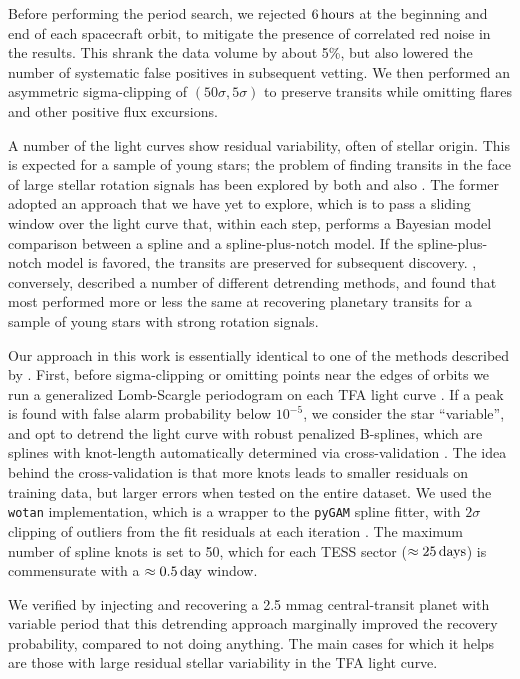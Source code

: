 \documentclass[12pt,twocolumn,tighten]{aastex62}
\begin{document}
Before performing the period search, we rejected $6\,{\rm hours}$ at
the beginning and end of each spacecraft orbit, to mitigate the
presence of correlated red noise in the results.  This shrank the data
volume by about 5\%, but also lowered the number of systematic false
positives in subsequent vetting.  We then performed an asymmetric
sigma-clipping of $(50\sigma,5\sigma)$ to preserve transits while
omitting flares and other positive flux excursions. 

A number of the light curves show residual variability, often of
stellar origin.  This is expected for a sample of young stars; the
problem of finding transits in the face of large stellar rotation
signals has been explored by both \citet{rizzuto_zeitV_2017} and also
\citet{hippke_wotan_2019}.  The former adopted an approach that we
have yet to explore, which is to pass a sliding window over the light
curve that, within each step, performs a Bayesian model comparison
between a spline and a spline-plus-notch model.  If the
spline-plus-notch model is favored, the transits are preserved for
subsequent discovery.  \citet{hippke_wotan_2019}, conversely,
described a number of different detrending methods, and found that
most performed more or less the same at recovering planetary transits
for a sample of young stars with strong rotation signals.

Our approach in this work is essentially identical to one of the
methods described by \citet{hippke_wotan_2019}.  First, before
sigma-clipping or omitting points near the edges of orbits we run a
generalized Lomb-Scargle periodogram on each TFA light curve
\citep{lomb_1976,scargle_studies_1982,vanderplas_periodograms_2015}.
If a peak is found with false alarm probability below $10^{-5}$, we
consider the star ``variable'', and opt to detrend the light curve
with robust penalized B-splines, which are splines with knot-length
automatically determined via cross-validation
\citep{eilers_flexible_1996}. The idea behind the cross-validation is
that more knots leads to smaller residuals on training data, but
larger errors when tested on the entire dataset.  We used the
\texttt{wotan} implementation, which is a wrapper to the
\texttt{pyGAM} spline fitter, with $2\sigma$ clipping of outliers from
the fit residuals at each iteration
\citep{serven_pygam_2018_1476122,hippke_wotan_2019}.  The maximum
number of spline knots is set to 50, which for each TESS sector
($\approx 25\,{\rm days}$) is commensurate with a $\approx0.5\,{\rm
day}$ window.

We verified by injecting and recovering a 2.5 mmag central-transit
planet with variable period that this detrending approach marginally
improved the recovery probability, compared to not doing anything.
The main cases for which it helps are those with large residual
stellar variability in the TFA light curve.
\end{document}
